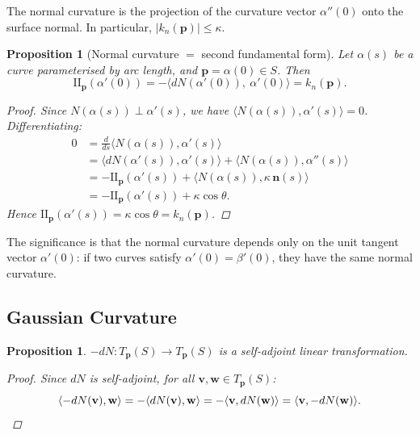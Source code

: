 \documentclass[10pt, a4paper]{article}
\theoremstyle{plain}
\newtheorem{proposition}[theorem]{Proposition}
\theoremstyle{definition}
\theoremstyle{remark}
\begin{document}
The normal curvature is the projection of the curvature vector $\alpha''(0)$ onto the
surface normal. In particular, $|k_n(\mathbf{p})| \leq \kappa$.

\begin{proposition}[Normal curvature $=$ second fundamental form]
  Let $\alpha(s)$ be a curve parameterised by arc length, and $\mathbf{p} = \alpha(0) \in S$.
  Then
  \[
    \mathrm{II}_{\mathbf{p}}(\alpha'(0))
    = -\langle dN(\alpha'(0)),\ \alpha'(0) \rangle
    = k_n(\mathbf{p}).
  \]


\begin{proof}
  Since $N(\alpha(s)) \perp \alpha'(s)$, we have $\langle N(\alpha(s)), \alpha'(s) \rangle = 0$.
  Differentiating:
  \begin{align*}
    0 &= \frac{d}{ds}\langle N(\alpha(s)), \alpha'(s) \rangle \\
      &= \langle dN(\alpha'(s)), \alpha'(s) \rangle + \langle N(\alpha(s)), \alpha''(s) \rangle \\
      &= -\mathrm{II}_{\mathbf{p}}(\alpha'(s)) + \langle N(\alpha(s)), \kappa\,\mathbf{n}(s) \rangle \\
      &= -\mathrm{II}_{\mathbf{p}}(\alpha'(s)) + \kappa\cos\theta.
  \end{align*}
  Hence $\mathrm{II}_{\mathbf{p}}(\alpha'(s)) = \kappa\cos\theta = k_n(\mathbf{p})$.
\end{proof}
\end{proposition}



The significance is that the normal curvature depends only on the unit tangent vector
$\alpha'(0)$: if two curves satisfy $\alpha'(0) = \beta'(0)$, they have the same normal curvature.

\subsection{Gaussian Curvature}

\begin{proposition}
  $-dN: T_{\mathbf{p}}(S) \to T_{\mathbf{p}}(S)$ is a self-adjoint linear transformation.

\begin{proof}
  Since $dN$ is self-adjoint, for all $\mathbf{v}, \mathbf{w} \in T_{\mathbf{p}}(S)$:
  \[
    \langle -dN(\mathbf{v}), \mathbf{w} \rangle
    = -\langle dN(\mathbf{v}), \mathbf{w} \rangle
    = -\langle \mathbf{v}, dN(\mathbf{w}) \rangle
    = \langle \mathbf{v}, -dN(\mathbf{w}) \rangle. \qedhere
  \]
\end{proof}
\end{proposition}
\end{document}
